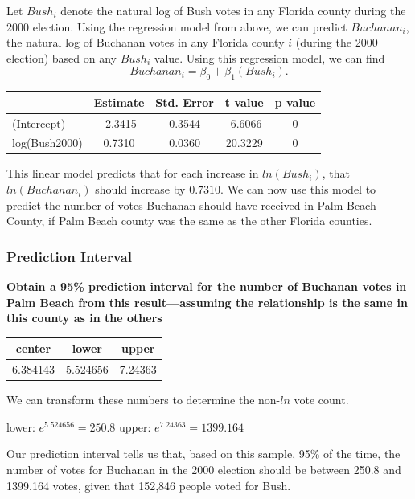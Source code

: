 \documentclass[
  letterpaper,
  DIV=11,
  numbers=noendperiod]{scrartcl}
\begin{document}
Let \(Bush_i\) denote the natural log of Bush votes in any Florida
county during the 2000 election. Using the regression model from above,
we can predict \(Buchanan_i\), the natural log of Buchanan votes in any
Florida county \(i\) (during the 2000 election) based on any \(Bush_i\)
value. Using this regression model, we can find
\[Buchanan_i = \beta_0 + \beta_1\left(Bush_i\right).\]

\begin{table}[H]
\centering
\begin{tabular}[t]{lcccc}
\toprule
  & Estimate & Std. Error & t value & p value\\
\midrule
(Intercept) & -2.3415 & 0.3544 & -6.6066 & 0\\
log(Bush2000) & 0.7310 & 0.0360 & 20.3229 & 0\\
\bottomrule
\end{tabular}
\end{table}

This linear model predicts that for each increase in \(ln(Bush_i)\),
that \(ln(Buchanan_i)\) should increase by \(0.7310\). We can now use
this model to predict the number of votes Buchanan should have received
in Palm Beach County, if Palm Beach county was the same as the other
Florida counties.

\hypertarget{prediction-interval}{%
\subsubsection{Prediction Interval}\label{prediction-interval}}

\textbf{Obtain a 95\% prediction interval for the number of Buchanan
votes in Palm Beach from this result---assuming the relationship is the
same in this county as in the others}

\begin{table}[H]
\centering
\begin{tabular}[t]{ccc}
\toprule
center & lower & upper\\
\midrule
6.384143 & 5.524656 & 7.24363\\
\bottomrule
\end{tabular}
\end{table}

We can transform these numbers to determine the non-\(ln\) vote count.

lower: \(e^{5.524656} = 250.8\) upper: \(e^{7.24363} = 1399.164\)

Our prediction interval tells us that, based on this sample, 95\% of the
time, the number of votes for Buchanan in the 2000 election should be
between 250.8 and 1399.164 votes, given that 152,846 people voted for
Bush.
\end{document}
